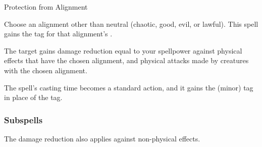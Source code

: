 \newpage
\begin{spellsection}{Protection from Alignment}

\begin{spellcontent}

\begin{spelltargetinginfo}



\end{spelltargetinginfo}


\begin{spelleffects}
\spellspecial
Choose an alignment other than neutral (chaotic, good, evil, or lawful).
This spell gains the tag for that alignment's .



\spelleffect
The target gains damage reduction equal to your spellpower against physical effects that have the chosen alignment, and physical attacks made by creatures with the chosen alignment.








\end{spelleffects}

\end{spellcontent}
\begin{spellfooter}


\end{spellfooter}
\begin{spellsubcontent}


\begin{spellcantrip}
The spell's casting time becomes a standard action, and it gains the  (minor) tag in place of the  tag.
\end{spellcantrip}


\end{spellsubcontent}
\end{spellsection}


\subsubsection{Subspells}



The damage reduction also applies against non-physical effects.






